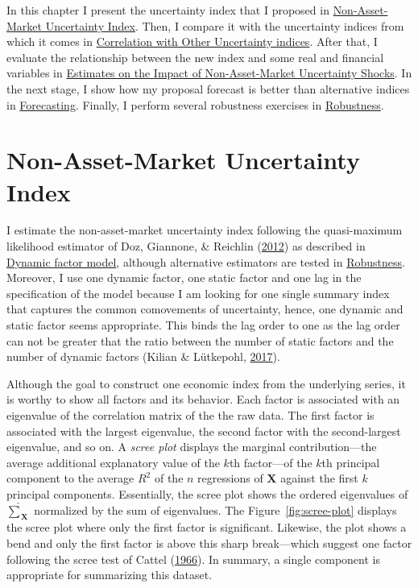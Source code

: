 \documentclass[12pt,twoside]{reedthesis}
\begin{document}
In this chapter I present the uncertainty index that I proposed in \protect\hyperlink{non-asset-market-uncertainty-index}{Non-Asset-Market Uncertainty Index}. Then, I compare it with the uncertainty indices from which it comes in \protect\hyperlink{correlation-with-uncertainty-indices}{Correlation with Other Uncertainty indices}. After that, I evaluate the relationship between the new index and some real and financial variables in \protect\hyperlink{estimates-on-the-impact-of-non-asset-market-uncertainty-shocks}{Estimates on the Impact of Non-Asset-Market Uncertainty Shocks}. In the next stage, I show how my proposal forecast is better than alternative indices in \protect\hyperlink{forecasting}{Forecasting}. Finally, I perform several robustness exercises in \protect\hyperlink{robustness}{Robustness}.

\hypertarget{non-asset-market-uncertainty-index}{%
\section{Non-Asset-Market Uncertainty Index}\label{non-asset-market-uncertainty-index}}

I estimate the non-asset-market uncertainty index following the quasi-maximum likelihood estimator of Doz, Giannone, \& Reichlin (\protect\hyperlink{ref-dozetal:2012}{2012}) as described in \protect\hyperlink{dynamic-factor-model}{Dynamic factor model}, although alternative estimators are tested in \protect\hyperlink{robustness}{Robustness}. Moreover, I use one dynamic factor, one static factor and one lag in the specification of the model because I am looking for one single summary index that captures the common comovements of uncertainty, hence, one dynamic and static factor seems appropriate. This binds the lag order to one as the lag order can not be greater that the ratio between the number of static factors and the number of dynamic factors (Kilian \& Lütkepohl, \protect\hyperlink{ref-kililutk:2017}{2017}).

Although the goal to construct one economic index from the underlying series, it is worthy to show all factors and its behavior. Each factor is associated with an eigenvalue of the correlation matrix of the the raw data. The first factor is associated with the largest eigenvalue, the second factor with the second-largest eigenvalue, and so on. A \emph{scree plot} displays the marginal contribution---the average additional explanatory value of the \(k\)th factor---of the \(k\)th principal component to the average \(R^{2}\) of the \(n\) regressions of \(\bm X\) against the first \(k\) principal components. Essentially, the scree plot shows the ordered eigenvalues of \(\hat{\sum}_{\bm X}\) normalized by the sum of eigenvalues. The Figure~\ref{fig:scree-plot} displays the scree plot where only the first factor is significant. Likewise, the plot shows a bend and only the first factor is above this sharp break---which suggest one factor following the scree test of Cattel (\protect\hyperlink{ref-cattel:1966}{1966}). In summary, a single component is appropriate for summarizing this dataset.
\end{document}
